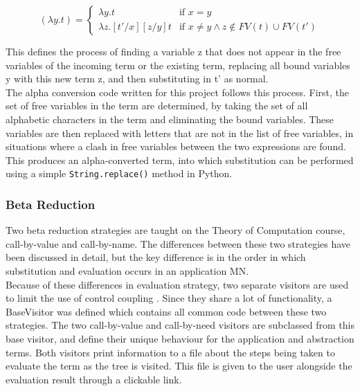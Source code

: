 \documentclass[a4paper,11pt]{report}
\begin{document}
\begin{equation*}
[t'/x](\lambda y.t)=\begin{cases}
\lambda y.t & \text{if $x=y$}\\
\lambda z.[t'/x][z/y]t & \text{if $x\ne y \land z\notin FV(t) \cup FV(t')$}
\end{cases}
\end{equation*}

This defines the process of finding a variable z that does not appear in the free variables of the incoming term or the existing term, replacing all bound variables y with this new term z, and then substituting in t’ as normal.\\

The alpha conversion code written for this project follows this process. First, the set of free variables in the term are determined, by taking the set of all alphabetic characters in the term and eliminating the bound variables. These variables are then replaced with letters that are not in the list of free variables, in situations where a clash in free variables between the two expressions are found. This produces an alpha-converted term, into which substitution can be performed using a simple \texttt{String.replace()} method in Python.

\subsubsection{Beta Reduction}

Two beta reduction strategies are taught on the Theory of Computation course, call-by-value and call-by-name. The differences between these two strategies have been discussed in detail, but the key difference is in the order in which substitution and evaluation occurs in an application MN.\\

Because of these differences in evaluation strategy, two separate visitors are used to limit the use of control coupling \cite{Lethbridge2004}. Since they share a lot of functionality, a BaseVisitor was defined which contains all common code between these two strategies. The two call-by-value and call-by-need visitors are subclassed from this base visitor, and define their unique behaviour for the application and abstraction terms. Both visitors print information to a file about the steps being taken to evaluate the term as the tree is visited. This file is given to the user alongside the evaluation result through a clickable link.\\
\end{document}
